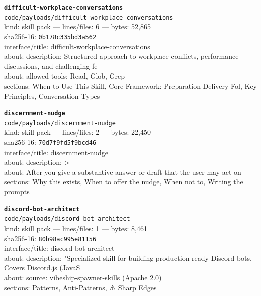 \noindent\textbf{\texttt{difficult-workplace-conversations}}\\
\texttt{code/payloads/difficult-workplace-conversations}\\
kind: skill pack --- lines/files: 6 --- bytes: 52,865\\
sha256-16: \texttt{0b178c335bd3a562}\\
interface/title: difficult-workplace-conversations\\
about: description: Structured approach to workplace conflicts, performance discussions, and challenging fe\\
about: allowed-tools: Read, Glob, Grep\\
sections: When to Use This Skill, Core Framework: Preparation-Delivery-Fol, Key Principles, Conversation Types\\
\vspace*{6.0pt}

\noindent\textbf{\texttt{discernment-nudge}}\\
\texttt{code/payloads/discernment-nudge}\\
kind: skill pack --- lines/files: 2 --- bytes: 22,450\\
sha256-16: \texttt{70d7f9fd5f9bcd46}\\
interface/title: discernment-nudge\\
about: description: >\\
about: After you give a substantive answer or draft that the user may act on\\
sections: Why this exists, When to offer the nudge, When not to, Writing the prompts\\
\vspace*{6.0pt}

\noindent\textbf{\texttt{discord-bot-architect}}\\
\texttt{code/payloads/discord-bot-architect}\\
kind: skill pack --- lines/files: 1 --- bytes: 8,461\\
sha256-16: \texttt{80b98ac995e81156}\\
interface/title: discord-bot-architect\\
about: description: "Specialized skill for building production-ready Discord bots. Covers Discord.js (JavaS\\
about: source: vibeship-spawner-skills (Apache 2.0)\\
sections: Patterns, Anti-Patterns, ⚠️ Sharp Edges\\
\vspace*{6.0pt}
\newpage

